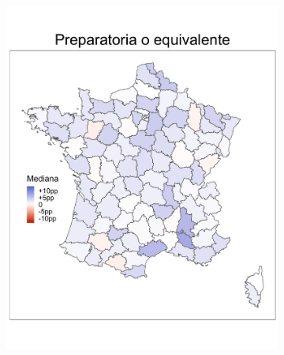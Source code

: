 \begin{figure}
\begin{subfigure}{0.275\textwidth}
	\includegraphics[width = \textwidth]{Figs/Efectos/Mapa_Efectos_Dip3_Modelo_H}
	\end{subfigure}
	~
	\begin{subfigure}{0.275\textwidth}

\end{subfigure}
\end{figure}
